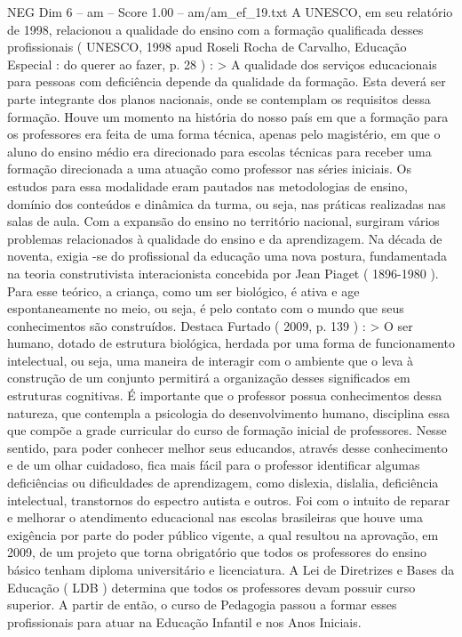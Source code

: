 \begin{textsample}{NEG Dim 6 – am – Score 1.00 – am/am\_ef\_19.txt}
A UNESCO, em seu relatório de 1998, relacionou a qualidade do ensino com a formação qualificada desses profissionais ( UNESCO, 1998 apud Roseli Rocha de Carvalho, Educação Especial : do querer ao fazer, p. 28 ) : > A qualidade dos serviços educacionais para pessoas com deficiência depende da qualidade da formação.
Esta deverá ser parte integrante dos planos nacionais, onde se contemplam os requisitos dessa formação.
Houve um momento na história do nosso país em que a formação para os professores era feita de uma forma técnica, apenas pelo magistério, em que o aluno do ensino médio era direcionado para escolas técnicas para receber uma formação direcionada a uma atuação como professor nas séries iniciais.
Os estudos para essa modalidade eram pautados nas metodologias de ensino, domínio dos conteúdos e dinâmica da turma, ou seja, nas práticas realizadas nas salas de aula.
Com a expansão do ensino no território nacional, surgiram vários problemas relacionados à qualidade do ensino e da aprendizagem.
Na década de noventa, exigia -se do profissional da educação uma nova postura, fundamentada na teoria construtivista interacionista concebida por Jean Piaget ( 1896-1980 ).
Para esse teórico, a criança, como um ser biológico, é ativa e age espontaneamente no meio, ou seja, é pelo contato com o mundo que seus conhecimentos são construídos.
Destaca Furtado ( 2009, p. 139 ) : > O ser humano, dotado de estrutura biológica, herdada por uma forma de funcionamento intelectual, ou seja, uma maneira de interagir com o ambiente que o leva à construção de um conjunto permitirá a organização desses significados em estruturas cognitivas.
É importante que o professor possua conhecimentos dessa natureza, que contempla a psicologia do desenvolvimento humano, disciplina essa que compõe a grade curricular do curso de formação inicial de professores.
Nesse sentido, para poder conhecer melhor seus educandos, através desse conhecimento e de um olhar cuidadoso, fica mais fácil para o professor identificar algumas deficiências ou dificuldades de aprendizagem, como dislexia, dislalia, deficiência intelectual, transtornos do espectro autista e outros.
Foi com o intuito de reparar e melhorar o atendimento educacional nas escolas brasileiras que houve uma exigência por parte do poder público vigente, a qual resultou na aprovação, em 2009, de um projeto que torna obrigatório que todos os professores do ensino básico tenham diploma universitário e licenciatura.
A Lei de Diretrizes e Bases da Educação ( LDB ) determina que todos os professores devam possuir curso superior.
A partir de então, o curso de Pedagogia passou a formar esses profissionais para atuar na Educação Infantil e nos Anos Iniciais.

\end{textsample}

